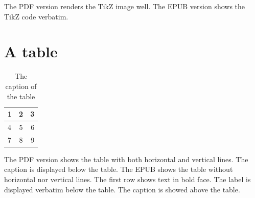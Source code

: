 \documentclass[ebook]{memoir}
\begin{document}
The PDF version renders the TikZ image well.
The EPUB version shows the TikZ code verbatim.

\section{A table}

\begin{table}[H]
  \begin{tabular}{ | l || c | r | }
    \hline                       
    1 & 2 & 3 \\
    \hline                       
    \hline                       
    4 & 5 & 6 \\
    7 & 8 & 9 \\
    \hline  
  \end{tabular}
  \label{tbl:my_table}
  \caption{The caption of the table}
\end{table}

The PDF version shows the table with both horizontal and vertical lines. The caption is displayed below the table.
The EPUB shows the table without horizontal nor vertical lines. The first row shows text in bold face. The label is displayed verbatim below the table. The caption is showed above the table.



\end{document}

